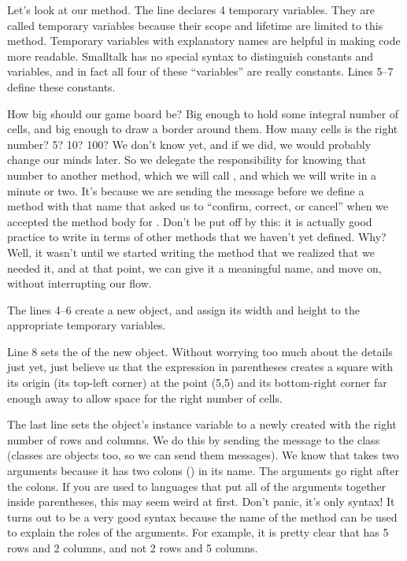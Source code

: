 \documentclass[a4paper,10pt,twoside]{book}
\begin{document}
Let's look at our  method.
The line   declares 4 temporary variables. They are called temporary variables because their scope and lifetime are limited to this method.  Temporary variables with explanatory names are helpful in making code more readable.  Smalltalk has no special syntax to distinguish constants and variables, and in fact all four of these ``variables'' are really constants. 
Lines 5--7 define these constants.

How big should our game board be?  Big enough to hold some integral number of cells, and big enough to draw a border around them.
How many cells is the right number?  5? 10? 100? We don't know yet, and if we did, we would probably change our minds later.  So we delegate the responsibility for knowing that number to another method, which we will call , and which we will write in a minute or two.
It's because we are sending the  message before we define a method with that name that \squeak asked us to ``confirm, correct, or cancel'' when we accepted the method body for .
Don't be put off by this: it is actually good practice to write in terms of other methods that we haven't yet defined.
Why?  Well, it wasn't until we started writing the  method that we realized that we needed it, and at that point, we can give it a meaningful name, and move on, without interrupting our flow.

The lines 4--6 create a new  object, and assign its width and height to the appropriate temporary variables. 

Line 8 sets the  of the new object.
Without worrying too much about the details just yet, just believe us that the expression in parentheses creates a square with its origin (\ie its top-left corner) at the point (5,5) and its bottom-right corner far enough away to allow space for the right number of cells.

The last line sets the  object's instance variable  to a newly created  with the right number of rows and columns.   We do this by sending the message  to the  class (classes are objects too, so we can send them messages).  We know that  takes two arguments because it has two colons (\ct{:}) in its name.   The arguments go right after the colons.
If you are used to languages that put all of the arguments together inside parentheses, this may seem weird at first.  Don't panic, it's only syntax!
It turns out to be a very good syntax because the name of the method can be used to explain the roles of the arguments.  For example, it is pretty clear that  has 5 rows and 2 columns, and not 2 rows and 5 columns.
\end{document}

